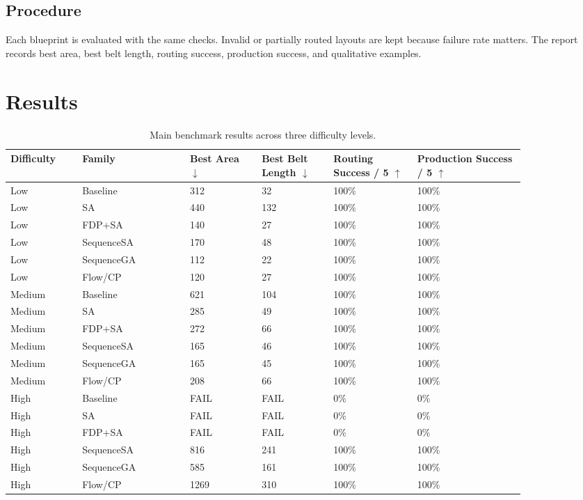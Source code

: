 \documentclass[11pt,a4paper]{article}
\begin{document}
\subsection{Procedure}

Each blueprint is evaluated with the same checks. Invalid or partially routed layouts are kept because failure rate matters. The report records best area, best belt length, routing success, production success, and qualitative examples.

\section{Results}
\label{sec:results}

\begin{table}[H]
    \centering
    \small
    \caption{Main benchmark results across three difficulty levels.}
    \label{tab:results}
    \setlength{\tabcolsep}{2pt}
    \begin{tabular}{@{}L{0.12\linewidth} L{0.18\linewidth} L{0.12\linewidth} L{0.12\linewidth} L{0.14\linewidth} L{0.18\linewidth}@{}}
        \toprule
        Difficulty & Family & Best Area $\downarrow$ & Best Belt Length $\downarrow$ & Routing Success / 5 $\uparrow$ & Production Success / 5 $\uparrow$ \\
        \midrule
        Low & Baseline & 312 & 32 & 100\% & 100\% \\
        Low & SA & 440 & 132 & 100\% & 100\% \\
        Low & FDP+SA & 140 & 27 & 100\%  & 100\% \\
        Low & SequenceSA & 170 & 48 & 100\%  & 100\%  \\
        Low & SequenceGA & 112 & 22 & 100\% & 100\% \\
        Low & Flow/CP & 120 & 27 & 100\% & 100\% \\
        \addlinespace
        Medium & Baseline & 621 & 104 & 100\% & 100\% \\
        Medium & SA & 285 & 49 & 100\% & 100\% \\
        Medium & FDP+SA & 272 & 66 & 100\% & 100\% \\
        Medium & SequenceSA & 165 & 46 & 100\%  & 100\%  \\
        Medium & SequenceGA & 165 & 45 & 100\%  & 100\% \\
        Medium & Flow/CP & 208 & 66 & 100\% & 100\% \\
        \addlinespace
        High & Baseline & FAIL & FAIL & 0\% & 0\% \\
        High & SA & FAIL & FAIL & 0\% & 0\% \\
        High & FDP+SA & FAIL & FAIL & 0\% & 0\% \\
        High & SequenceSA & 816 & 241 & 100\% & 100\% \\
        High & SequenceGA & 585 & 161 & 100\% & 100\% \\
        High & Flow/CP & 1269 & 310 & 100\% & 100\% \\
        \bottomrule
    \end{tabular}
\end{table}
\end{document}
